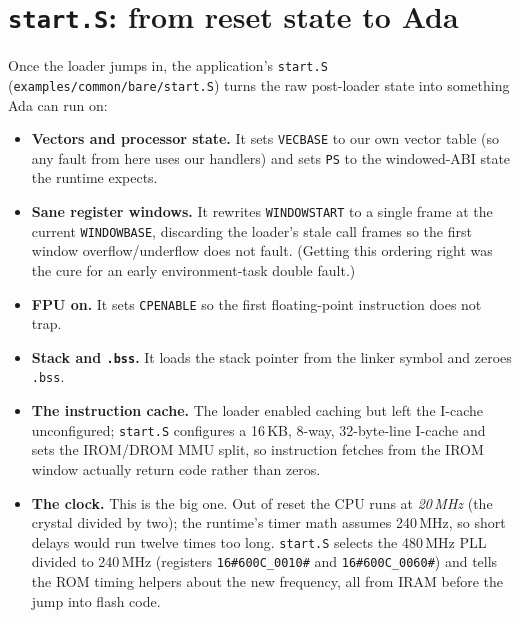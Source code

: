 
\section{\texttt{start.S}: from reset state to Ada}

Once the loader jumps in, the application's \texttt{start.S}
(\texttt{examples/common/bare/start.S}) turns the raw post-loader state into
something Ada can run on:

\begin{itemize}
\item \textbf{Vectors and processor state.} It sets \texttt{VECBASE} to our own
  vector table (so any fault from here uses our handlers) and sets \texttt{PS} to
  the windowed-ABI state the runtime expects.
\item \textbf{Sane register windows.} It rewrites \texttt{WINDOWSTART} to a single
  frame at the current \texttt{WINDOWBASE}, discarding the loader's stale call
  frames so the first window overflow/underflow does not fault. (Getting this
  ordering right was the cure for an early environment-task double fault.)
\item \textbf{FPU on.} It sets \texttt{CPENABLE} so the first floating-point
  instruction does not trap.
\item \textbf{Stack and \texttt{.bss}.} It loads the stack pointer from the
  linker symbol and zeroes \texttt{.bss}.
\item \textbf{The instruction cache.} The loader enabled caching but left the
  I-cache unconfigured; \texttt{start.S} configures a 16\,KB, 8-way, 32-byte-line
  I-cache and sets the IROM/DROM MMU split, so instruction fetches from the IROM
  window actually return code rather than zeros.
\item \textbf{The clock.} This is the big one. Out of reset the CPU runs at
  \emph{20\,MHz} (the crystal divided by two); the runtime's timer math assumes
  240\,MHz, so short delays would run twelve times too long. \texttt{start.S}
  selects the 480\,MHz PLL divided to 240\,MHz (registers
  \texttt{16\#600C\_0010\#} and \texttt{16\#600C\_0060\#}) and tells the ROM timing
  helpers about the new frequency, all from IRAM before the jump into flash code.
\end{itemize}

